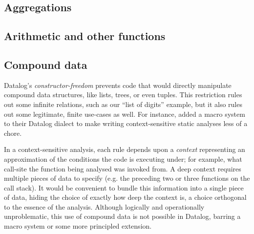 

\subsection{Aggregations}



\subsection{Arithmetic and other functions}


\XXX


\subsection{Compound data}

Datalog's \emph{constructor-freedom} prevents code that would directly
manipulate compound data structures, like lists, trees, or even tuples. This
restriction rules out some infinite relations, such as our ``list of digits''
example, but it also rules out some legitimate, finite use-cases as well.
%
For instance, \citet{DBLP:conf/datalog/SmaragdakisB10} added a macro system to
their Datalog dialect to make writing context-sensitive static analyses less of
a chore.

In a context-sensitive analysis, each rule depends upon a \emph{context} representing an approximation of the conditions the code is executing under; for example, what call-site the function being analysed was invoked from.
%
A deep context requires multiple pieces of data to specify (e.g. the preceding
two or three functions on the call stack).
%
It would be convenient to bundle this information into a single piece of data,
hiding the choice of exactly how deep the context is, a choice orthogonal to the
essence of the analysis.
%
Although logically and operationally unproblematic, this use of compound data is
not possible in Datalog, barring a macro system or some more principled
extension.

